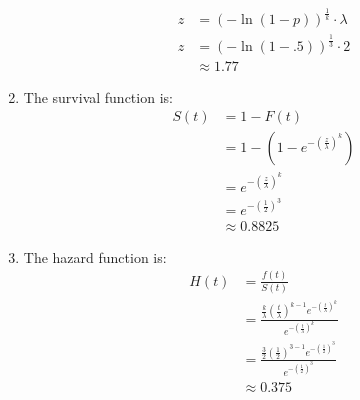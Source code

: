 \documentclass{article}
\begin{document}
\begin{enumerate}
\begin{align*}
z &= (-\ln(1 - p))^{\frac{1}{k}} \cdot \lambda \\
z &= (-\ln(1 - .5))^{\frac{1}{3}} \cdot 2 \\
&\approx 1.77
\end{align*}
\item The survival function is: \\
\begin{align*}
S(t) &= 1 - F(t) \\
&= 1 - (1 - e^{-(\frac{z}{\lambda})^k}) \\
& = e^{-(\frac{z}{\lambda})^k} \\
&=  e^{-(\frac{1}{2})^3} \\
&\approx 0.8825
\end{align*}
\item The hazard function is: \\
\begin{align*}
H(t) &= \frac{f(t)}{S(t)} \\
&= \frac{\frac{k}{\lambda} (\frac{t}{\lambda})^{k-1}e^{-(\frac{t}{\lambda})^k}}{e^{-(\frac{t}{\lambda})^k}} \\
&= \frac{\frac{3}{2} (\frac{1}{2})^{3-1}e^{-(\frac{1}{2})^3}}{e^{-(\frac{1}{2})^3}} \\
&\approx 0.375
\end{align*}
\end{enumerate}
\end{document}
